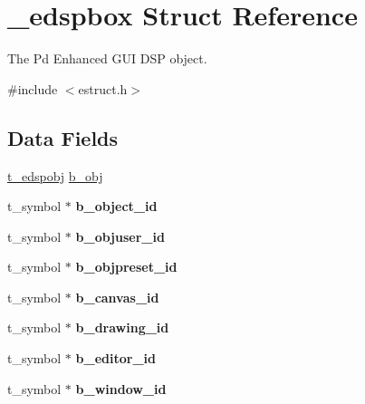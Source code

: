 \hypertarget{struct__edspbox}{\section{\-\_\-edspbox Struct Reference}
\label{struct__edspbox}
}


The Pd Enhanced G\-U\-I D\-S\-P object.  




{\ttfamily \#include $<$estruct.\-h$>$}

\subsection*{Data Fields}
\begin{DoxyCompactItemize}
\item 
\hyperlink{struct__edspobj}{t\-\_\-edspobj} \hyperlink{struct__edspbox_a8a991907db2d274664740c5f19569148}{b\-\_\-obj}
\item 
\hypertarget{struct__edspbox_ae34af00c0a1b333cb06b30666f0ffc39}{t\-\_\-symbol $\ast$ {\bfseries b\-\_\-object\-\_\-id}}\label{struct__edspbox_ae34af00c0a1b333cb06b30666f0ffc39}

\item 
\hypertarget{struct__edspbox_ae324f65e10196cc7e166652e8d7d394d}{t\-\_\-symbol $\ast$ {\bfseries b\-\_\-objuser\-\_\-id}}\label{struct__edspbox_ae324f65e10196cc7e166652e8d7d394d}

\item 
\hypertarget{struct__edspbox_adc377263d208d1051f4a0997868b1155}{t\-\_\-symbol $\ast$ {\bfseries b\-\_\-objpreset\-\_\-id}}\label{struct__edspbox_adc377263d208d1051f4a0997868b1155}

\item 
\hypertarget{struct__edspbox_ac0251c6969a1032f8f50d076e909fb3e}{t\-\_\-symbol $\ast$ {\bfseries b\-\_\-canvas\-\_\-id}}\label{struct__edspbox_ac0251c6969a1032f8f50d076e909fb3e}

\item 
\hypertarget{struct__edspbox_a153f9c9929d722ecb29217f3fb0914c9}{t\-\_\-symbol $\ast$ {\bfseries b\-\_\-drawing\-\_\-id}}\label{struct__edspbox_a153f9c9929d722ecb29217f3fb0914c9}

\item 
\hypertarget{struct__edspbox_adf8c80c6ea45ad810c754984d98830ff}{t\-\_\-symbol $\ast$ {\bfseries b\-\_\-editor\-\_\-id}}\label{struct__edspbox_adf8c80c6ea45ad810c754984d98830ff}

\item 
\hypertarget{struct__edspbox_a7033df943e798c68e3a6117785c2d79e}{t\-\_\-symbol $\ast$ {\bfseries b\-\_\-window\-\_\-id}}\label{struct__edspbox_a7033df943e798c68e3a6117785c2d79e}


\end{DoxyCompactItemize}
